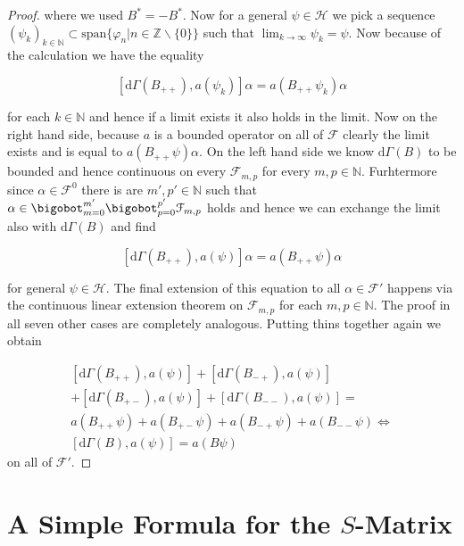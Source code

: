 \documentclass[b5paper,draft,openbib,12pt]{memoir}
\begin{document}
\begin{proof}
where we used \(B^*=-B^*\). Now for a general \(\psi\in\mathcal{H}\) we pick a sequence 
\((\psi_k)_{k\in\mathbb{N}}\subset \text{span}\{\varphi_{n}| n \in \mathbb{Z}\backslash\{0\}\}\)
such that \(\lim_{k\rightarrow \infty} \psi_k = \psi\). Now because of the calculation we have the equality

\begin{equation}
\left[ \mathrm{d}\Gamma(B_{++}),a(\psi_k) \right] \alpha =a(B_{++}\psi_k)\alpha
\end{equation}

for each \(k\in\mathbb{N}\) and hence if a limit exists it also holds in the limit. Now on the right hand side, because
\(a\) is a bounded operator on all of \(\mathcal{F}\) clearly the limit exists and is equal to \(a(B_{++}\psi)\alpha\).
On the left hand side we know \(\mathrm{d}\Gamma(B)\) to be bounded and hence continuous on every \(\mathcal{F}_{m,p}\)
for every \(m,p\in\mathbb{N}\).  Furhtermore since \(\alpha\in\mathcal{F}^0\) there is are \(m',p'\in\mathbb{N}\) such that 
\(\alpha \in \bigobot_{m=0}^{m'}\bigobot_{p=0}^{p'} \mathcal{F}_{m,p}\) holds and hence we can exchange the limit also 
with \(\mathrm{d}\Gamma(B)\) and find

\begin{equation}
\left[ \mathrm{d}\Gamma(B_{++}),a(\psi) \right] \alpha =a(B_{++}\psi)\alpha
\end{equation}

for general \(\psi\in\mathcal{H}\). The final extension of this equation to all \(\alpha \in \mathcal{F}'\) happens via the continuous linear
extension theorem on \(\mathcal{F}_{m,p}\) for each \(m,p\in\mathbb{N}\). The proof in all seven other cases are completely analogous.
Putting thins together again we obtain

\begin{align}
\left[ \mathrm{d}\Gamma(B_{++}),a(\psi) \right] +\left[ \mathrm{d}\Gamma(B_{-+}),a(\psi) \right] \\
+\left[ \mathrm{d}\Gamma(B_{+-}),a(\psi) \right] +\left[ \mathrm{d}\Gamma(B_{--}),a(\psi) \right]  =\\
a(B_{++}\psi)+a(B_{+-}\psi)+a(B_{-+}\psi)+a(B_{--}\psi)\iff \\
\left[ \mathrm{d}\Gamma(B),a(\psi) \right] =a(B\psi)
\end{align}
on all of \(\mathcal{F}'\).

\end{proof}

 

\section{A Simple Formula for the \(S\)-Matrix}\label{sec:proof simple formula}
\end{document}
